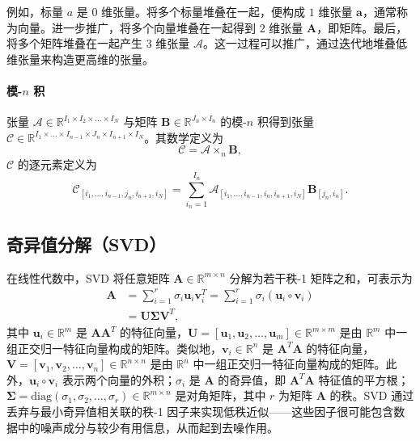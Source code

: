例如，标量 $a$ 是 $0$ 维张量。将多个标量堆叠在一起，便构成 $1$ 维张量 $\mathbf{a}$，通常称为向量。进一步推广，将多个向量堆叠在一起得到 $2$ 维张量 $\mathbf{A}$，即矩阵。最后，将多个矩阵堆叠在一起产生 $3$ 维张量 $\mathcal{A}$。这一过程可以推广，通过迭代地堆叠低维张量来构造更高维的张量。

\paragraph{模-$n$ 积} 张量 $\mathcal{A} \in \mathbb{R}^{I_1 \times I_2 \times \dots \times I_N}$ 与矩阵 $\mathbf{B} \in \mathbb{R}^{J_n \times I_n}$ 的模-$n$ 积得到张量 $\mathcal{C} \in \mathbb{R}^{I_1 \times \dots \times I_{n-1} \times J_n \times I_{n+1} \times I_N}$。其数学定义为
\begin{equation}
    \mathcal{C} = \mathcal{A} \times_n \mathbf{B},
\label{eq:mode_n_product}
\end{equation}
$\mathcal{C}$ 的逐元素定义为
\begin{equation}
    \mathcal{C}_{[i_1,\dots,i_{n-1}, j_n, i_{n+1}, i_N]} = \sum_{i_n=1}^{I_n} \mathcal{A}_{[i_1,\dots,i_{n-1}, i_n, i_{n+1}, i_N]} \mathbf{B}_{[j_n, i_n]}.
\label{eq:mode_n_product_index_notation}
\end{equation}
\subsection{奇异值分解（SVD）}
在线性代数中，SVD 将任意矩阵 $\mathbf{A} \in \mathbb{R}^{m \times n}$ 分解为若干秩-1 矩阵之和，可表示为
\begin{equation}
\begin{split}
    \mathbf{A} &=  \sum_{i=1}^{r} \sigma_i \mathbf{u}_i \mathbf{v}_i^T = \sum_{i=1}^{r} \sigma_i \left( \mathbf{u}_i \circ \mathbf{v}_i \right)\\
    &= \mathbf{U} \boldsymbol{\Sigma} \mathbf{V}^T,
\end{split}
\label{eq:SVD}
\end{equation}
其中 $\mathbf{u}_i \in \mathbb{R}^m$ 是 $\mathbf{A}\mathbf{A}^T$ 的特征向量，$\mathbf{U} = \left[\mathbf{u}_1, \mathbf{u}_2, \dots, \mathbf{u}_m \right] \in \mathbb{R}^{m \times m}$ 是由 $\mathbb{R}^{m}$ 中一组正交归一特征向量构成的矩阵。类似地，$\mathbf{v}_i \in \mathbb{R}^n$ 是 $\mathbf{A}^T\mathbf{A}$ 的特征向量，$\mathbf{V} = \left[\mathbf{v}_1, \mathbf{v}_2, \dots, \mathbf{v}_n \right] \in \mathbb{R}^{n \times n}$ 是由 $\mathbb{R}^{n}$ 中一组正交归一特征向量构成的矩阵。此外，$\mathbf{u}_i \circ \mathbf{v}_i$ 表示两个向量的外积；$\sigma_i$ 是 $\mathbf{A}$ 的奇异值，即 $\mathbf{A}^T\mathbf{A}$ 特征值的平方根；$\boldsymbol{\Sigma} = \text{diag}\left( \sigma_1, \sigma_2, \dots, \sigma_r \right) \in \mathbb{R}^{m \times n}$ 是对角矩阵，其中 $r$ 为矩阵 $\mathbf{A}$ 的秩。SVD 通过丢弃与最小奇异值相关联的秩-1 因子来实现低秩近似——这些因子很可能包含数据中的噪声成分与较少有用信息，从而起到去噪作用。


